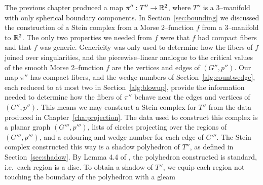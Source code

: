 The previous chapter produced a map $\pi'':T''\to \mathbb{R}^2$, where $T''$ is a 3--manifold with only spherical boundary components.
In Section~\ref{sec:bounding} we discussed the construction of a Stein complex from a Morse 2--function $f$ from a 3--manifold to $\mathbb{R}^2$.
The only two properties we needed from $f$ were that $f$ had compact fibers and that $f$ was generic.
Genericity was only used to determine how the fibers of $f$ joined over singularities, and the piecewise--linear analogue to the critical values of the smooth Morse 2--function $f$ are the vertices and edges of $(G'',p'')$.
Our map $\pi''$ has compact fibers, and the wedge numbers of Section~\ref{alg:countwedge}, each reduced to at most two in Section~\ref{alg:blowup}, provide the information needed to determine how the fibers of $\pi''$ behave near the edges and vertices of $(G'',p'')$.
This means we may construct a Stein complex for $T''$ from the data produced in Chapter~\ref{cha:projection}.
The data used to construct this complex is a planar graph $(G''',p''')$, lists of circles projecting over the regions of $(G''',p''')$, and a colouring and wedge number for each edge of $G'''$.
The Stein complex constructed this way is a shadow polyhedron of $T''$, as defined in Section~\ref{sec:shadow}.
By Lemma 4.4 of \cite{CostThur08}, the polyhedron constructed is standard, i.e.\ each region is a disc.
To obtain a shadow of $T''$, we equip each region not touching the boundary of the polyhedron with a gleam


